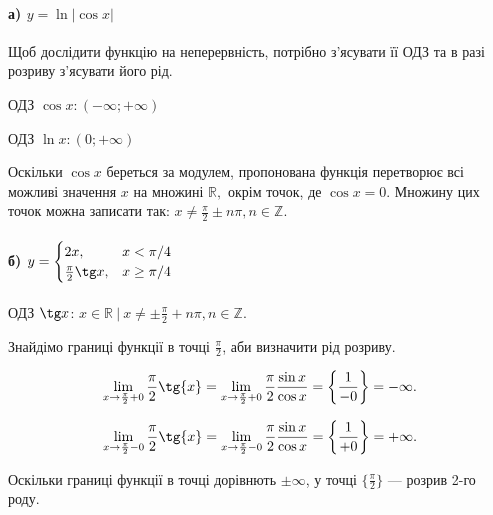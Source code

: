 \documentclass[../rgr1.tex]{subfiles}
\begin{document}

\paragraph{
	а) $y = \ln |\cos x|$
}

\Solution

Щоб дослідити функцію на неперервність, потрібно з'ясувати
її ОДЗ та в разі розриву з'ясувати його рід.

ОДЗ $\cos x: (-\infty; +\infty)$

ОДЗ $\ln x: (0; +\infty)$

Оскільки $\cos x$ береться за модулем, пропонована функція перетворює
всі можливі значення $x$ на множині $\mathbb R,$ окрім точок, де
$\cos x = 0.$ Множину цих точок можна записати так: $x \neq \frac{\pi}{2} \pm n\pi, n \in \mathbb Z.$

\paragraph{
	б) $y =
	\begin{cases}
		2x, & x < \pi/4 \\
		\frac{\pi}{2}\tg x, & x \geq \pi/4
	\end{cases}
	$
}

\Solution


ОДЗ $\tg x$: $x \in \mathbb R~|~
x \neq \pm \frac{\pi}{2} + n\pi, n \in \mathbb Z$.

Знайдімо границі
функції в точці $\frac{\pi}{2}$, аби визначити рід розриву.

\begin{equation}
	\lim_{x\to\frac{\pi}{2}+0}\frac{\pi}{2}\tg{x} =
	\lim_{x\to\frac{\pi}{2}+0}\frac{\pi}{2}\frac{\sin x}{\cos x} =
	\left\{ \frac{1}{-0} \right\} = -\infty.
\end{equation}

\begin{equation}
	\lim_{x\to\frac{\pi}{2}-0}\frac{\pi}{2}\tg{x} =
	\lim_{x\to\frac{\pi}{2}-0}\frac{\pi}{2}\frac{\sin x}{\cos x} =
	\left\{ \frac{1}{+0} \right\} = +\infty.
\end{equation}

 Оскільки границі функції в точці дорівнють $\pm\infty$, у точці $\{\frac{\pi}{2}\}$ --- розрив 2-го роду.

\end{document}
